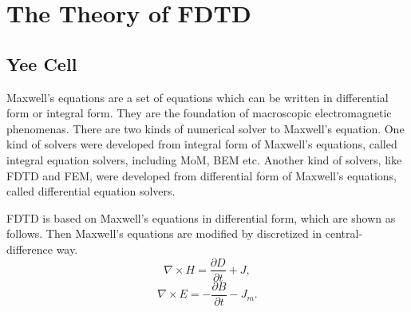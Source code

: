 
\chapter{The Theory of FDTD}
\section{Yee Cell}
Maxwell's equations are a set of equations which can be written in differential form or integral form. They are the foundation of macroscopic electromagnetic phenomenas. There are two kinds of numerical solver to Maxwell's equation. One kind of solvers were developed from integral form of Maxwell's equations, called integral equation solvers, including MoM, BEM etc. Another kind of solvers, like FDTD and FEM, were developed from differential form of Maxwell's equations, called differential equation solvers.

FDTD is based on Maxwell's equations in differential form, which are shown as follows. Then Maxwell's equations are modified by discretized in central-difference way.
\begin{equation}\label{maxwellH}
\nabla\times\mathbf{\mathit{H}}=\frac{\partial \mathbb{\mathit{D}}}{\partial t}+\mathbf{\mathit{J}},
\end{equation}
\begin{equation}\label{maxwellE}
\nabla\times\mathbf{\mathit{E}}=-\frac{\partial \mathbb{\mathit{B}}}{\partial t}-\mathbf{\mathit{J}}_m.
\end{equation}


